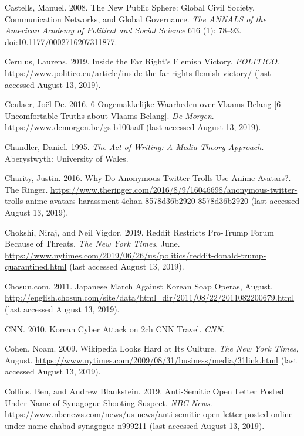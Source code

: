 \documentclass[10pt,british,A4paper,oneside]{memoir}
\begin{document}
\hypertarget{ref-castells_new_2008}{}
Castells, Manuel. 2008. The New Public Sphere: Global Civil Society,
Communication Networks, and Global Governance. \emph{The ANNALS of the
American Academy of Political and Social Science} 616 (1): 78--93.
doi:\href{https://doi.org/10.1177/0002716207311877}{10.1177/0002716207311877}.

\hypertarget{ref-cerulus_inside_2019}{}
Cerulus, Laurens. 2019. Inside the Far Right's Flemish Victory.
\emph{POLITICO}.
\url{https://www.politico.eu/article/inside-the-far-rights-flemish-victory/} (last accessed August 13, 2019).

\hypertarget{ref-ceulaer_6_2016}{}
Ceulaer, Joël De. 2016. 6 Ongemakkelijke Waarheden over Vlaams Belang [6 Uncomfortable Truths about Vlaams Belang].
\emph{De Morgen}. \url{https://www.demorgen.be/gs-b100aaff} (last accessed August 13, 2019).

\hypertarget{ref-chandler_act_1995}{}
Chandler, Daniel. 1995. \emph{The Act of Writing: A Media Theory
Approach}. Aberystwyth: University of Wales.

\hypertarget{ref-charity_why_2016}{}
Charity, Justin. 2016. Why Do Anonymous Twitter Trolls Use Anime Avatars?. The Ringer.
\url{https://www.theringer.com/2016/8/9/16046698/anonymous-twitter-trolls-anime-avatars-harassment-4chan-8578d36b2920-8578d36b2920} (last accessed August 13, 2019).

\hypertarget{ref-chokshi_reddit_2019}{}
Chokshi, Niraj, and Neil Vigdor. 2019. Reddit Restricts Pro-Trump Forum
Because of Threats. \emph{The New York Times}, June.
\url{https://www.nytimes.com/2019/06/26/us/politics/reddit-donald-trump-quarantined.html} (last accessed August 13, 2019).

\hypertarget{ref-chosun.com_japanese_2011}{}
Chosun.com. 2011. Japanese March Against Korean Soap Operas, August.
\url{http://english.chosun.com/site/data/html_dir/2011/08/22/2011082200679.html} (last accessed August 13, 2019).

\hypertarget{ref-cnn_korean_2010}{}
CNN. 2010. Korean Cyber Attack on 2ch CNN Travel.
\emph{CNN}.

\hypertarget{ref-cohen_wikipedia_2009}{}
Cohen, Noam. 2009. Wikipedia Looks Hard at Its Culture. \emph{The New
York Times}, August.
\url{https://www.nytimes.com/2009/08/31/business/media/31link.html} (last accessed August 13, 2019).

\hypertarget{ref-collins_anti-semitic_2019}{}
Collins, Ben, and Andrew Blankstein. 2019. Anti-Semitic Open Letter
Posted Under Name of Synagogue Shooting Suspect. \emph{NBC News}.
\url{https://www.nbcnews.com/news/us-news/anti-semitic-open-letter-posted-online-under-name-chabad-synagogue-n999211} (last accessed August 13, 2019).
\end{document}
